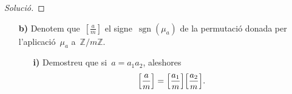 \documentclass[a4paper]{article}
\newcommand{\ZZ}{\mathbb{Z}}
\DeclareMathOperator{\sgn}{sgn}
\newenvironment{solution}{
    \renewcommand\qedsymbol{\ensuremath{\lozenge}}
    \begin{proof}[Solució]
        }{
    \end{proof}
}
\begin{document}
\begin{solution}
\end{solution}

\begin{enumerate}
    \item[\textbf{b)}] Denotem que~\([\frac{a}{m}]\) el signe~\(\sgn(\mu_{a})\)
        de la permutació donada per l'aplicació~\(\mu_{a}\) a~\(\ZZ/m\ZZ\).
        \begin{enumerate}
            \item[\textbf{i)}] Demostreu que si~\(a=a_{1}a_{2}\), aleshores
                \[
                    \Bigl[\frac{a}{m}\Bigr]
                    =
                    \Bigl[\frac{a_{1}}{m}\Bigr]
                    \Bigl[\frac{a_{2}}{m}\Bigr].
                \]
        \end{enumerate}
\end{enumerate}
\end{document}
